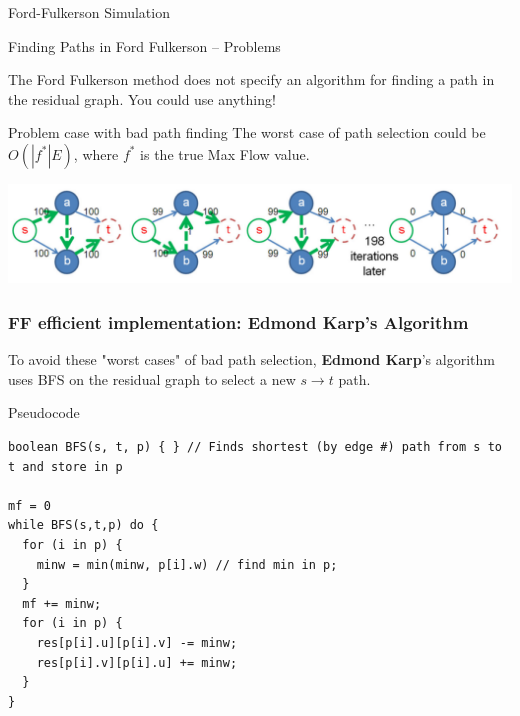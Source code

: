 \begin{frame}{Ford-Fulkerson Simulation}
  \vspace{10cm}
\end{frame}

\begin{frame}{Finding Paths in Ford Fulkerson -- Problems}

The Ford Fulkerson method does not specify an algorithm for finding a path in the residual graph. You could use anything!\bigskip

\begin{exampleblock}{Problem case with bad path finding}
  The worst case of path selection could be $O(|f^*|E)$, where $f^*$ is the true Max Flow value.\medskip

  \includegraphics[width=1\textwidth]{../img/ff_worst_halim}
\end{exampleblock}
\end{frame}

\begin{frame}[fragile]
  \frametitle{FF efficient implementation: Edmond Karp's Algorithm}

  \begin{block}{}
    To avoid these "worst cases" of bad path selection, {\bf Edmond Karp}'s algorithm uses BFS on the residual graph to select a new $s\to t$ path.
  \end{block}

{\smaller
\begin{block}{Pseudocode}
\begin{verbatim}
boolean BFS(s, t, p) { } // Finds shortest (by edge #) path from s to t and store in p

mf = 0
while BFS(s,t,p) do {
  for (i in p) {
    minw = min(minw, p[i].w) // find min in p;
  }
  mf += minw;
  for (i in p) {
    res[p[i].u][p[i].v] -= minw;
    res[p[i].v][p[i].u] += minw;
  }
}
\end{verbatim}
\end{block}
}
\end{frame}


